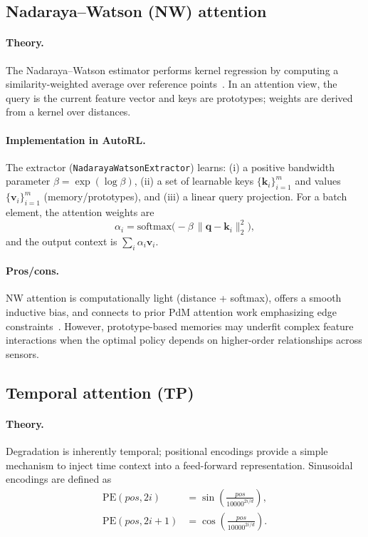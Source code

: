 \documentclass[11pt]{article}
\begin{document}
\subsection{Nadaraya--Watson (NW) attention}
\paragraph{Theory.}
The Nadaraya--Watson estimator performs kernel regression by computing a similarity-weighted average over reference points~\cite{Nadaraya1964, Watson1964}. In an attention view, the query is the current feature vector and keys are prototypes; weights are derived from a kernel over distances.

\paragraph{Implementation in AutoRL.}
The extractor (\texttt{NadarayaWatsonExtractor}) learns:
(i) a positive bandwidth parameter $\beta=\exp(\log\beta)$,
(ii) a set of learnable keys $\{\mathbf{k}_i\}_{i=1}^m$ and values $\{\mathbf{v}_i\}_{i=1}^m$ (memory/prototypes), and
(iii) a linear query projection.
For a batch element, the attention weights are
\begin{equation}
  \alpha_i = \mathrm{softmax}\bigl(-\beta\,\lVert \mathbf{q}-\mathbf{k}_i\rVert_2^2\bigr),
\end{equation}
and the output context is $\sum_i \alpha_i\mathbf{v}_i$.

\paragraph{Pros/cons.}
NW attention is computationally light (distance + softmax), offers a smooth inductive bias, and connects to prior PdM attention work emphasizing edge constraints~\cite{Siraskar2024NWAttention}. However, prototype-based memories may underfit complex feature interactions when the optimal policy depends on higher-order relationships across sensors.

\subsection{Temporal attention (TP)}
\paragraph{Theory.}
Degradation is inherently temporal; positional encodings provide a simple mechanism to inject time context into a feed-forward representation. Sinusoidal encodings are defined as
\begin{align}
  \mathrm{PE}(pos,2i) &= \sin\left(\frac{pos}{10000^{2i/d}}\right),\\
  \mathrm{PE}(pos,2i{+}1) &= \cos\left(\frac{pos}{10000^{2i/d}}\right).
\end{align}
\end{document}
